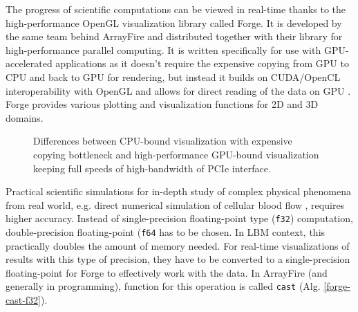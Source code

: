 The progress of scientific computations can be viewed in real-time thanks to the high-performance OpenGL visualization library called Forge. It is developed by the same team behind ArrayFire and distributed together with their library for high-performance parallel computing. It is written specifically for use with GPU-accelerated applications as it doesn't require the expensive copying from GPU to CPU and back to GPU for rendering, but instead it builds on CUDA/OpenCL interoperability with OpenGL and allows for direct reading of the data on GPU \citep{forge2016}. Forge provides various plotting and visualization functions for 2D and 3D domains.

\begin{figure}[!ht]
	\centering
	 \qquad
	\caption{Differences between CPU-bound visualization with expensive copying bottleneck and high-performance GPU-bound visualization keeping full speeds of high-bandwidth of PCIe interface.}
	\label{fig:viz-forge-main}
\end{figure}

Practical scientific simulations for in-depth study of complex physical phenomena from real world, e.g. direct numerical simulation of cellular blood flow \citep{kotsalosDigitalBloodMassively2019}, requires higher accuracy. Instead of single-precision floating-point type (\texttt{f32}) computation, double-precision floating-point (\texttt{f64} has to be chosen. In LBM context, this practically doubles the amount of memory needed. For real-time visualizations of results with this type of precision, they have to be converted to a single-precision floating-point for Forge to effectively work with the data. In ArrayFire (and generally in programming), function for this operation is called \texttt{cast} (Alg. \ref{forge-cast-f32}).

